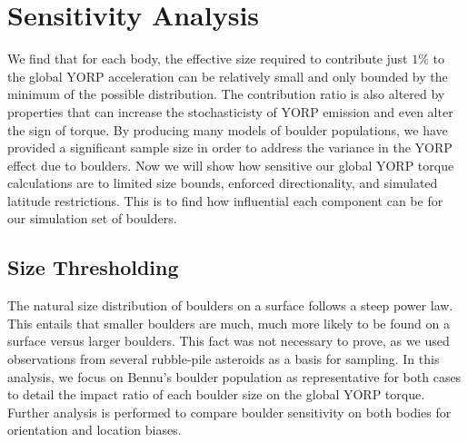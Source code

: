 \section{Sensitivity Analysis}\label{sens_analysis}

We find that for each body, the effective size required to contribute just $1\%$ to the global YORP acceleration can be relatively small and only bounded by the minimum of the possible distribution. The contribution ratio is also altered by properties that can increase the stochasticisty of YORP emission and even alter the sign of torque. By producing many models of boulder populations, we have provided a significant sample size in order to address the variance in the YORP effect due to boulders. Now we will show how sensitive our global YORP torque calculations are to limited size bounds, enforced directionality, and simulated latitude restrictions. This is to find how influential each component can be for our simulation set of boulders. 

\subsection{Size Thresholding}
The natural size distribution of boulders on a surface follows a steep power law. This entails that smaller boulders are much, much more likely to be found on a surface versus larger boulders. This fact was not necessary to prove, as we used observations from several rubble-pile asteroids as a basis for sampling. In this analysis, we focus on Bennu's boulder population as representative for both cases to detail the impact ratio of each boulder size on the global YORP torque. Further analysis is performed to compare boulder sensitivity on both bodies for orientation and location biases. 

